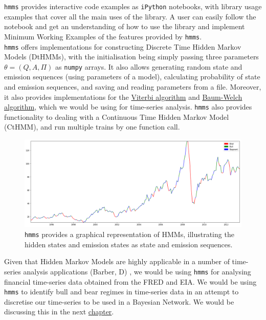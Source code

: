 \texttt{hmms} provides interactive code examples as \texttt{iPython} notebooks, with library usage examples that cover all the main uses of the library. A user can easily follow the notebook and get an understanding of how to use the library and implement Minimum Working Examples of the features provided by \texttt{hmms}.\\

\texttt{hmms} offers implementations for constructing Discrete Time Hidden Markov Models (DtHMMs), with the initialisation being simply passing three parameters $\theta = (Q, A, \Pi)$ as \texttt{numpy} arrays. It also allows generating random state and emission sequences (using parameters of a model), calculating probability of state and emission sequences, and saving and reading parameters from a file. Moreover, it also provides implementations for the \hyperref[viterbi]{Viterbi algorithm} and \hyperref[baumwelch]{Baum-Welch algorithm}, which we would be using for time-series analysis. \texttt{hmms} also provides functionality to dealing with a Continuous Time Hidden Markov Model (CtHMM), and run multiple trains by one function call. \\

\begin{figure}
  \centering
  \includegraphics[width=15cm, scale=0.2]{img/index.png}
  \caption{\texttt{hmms} provides a graphical representation of HMMs, illustrating the hidden states and emission states as state and emission sequences.}
\end{figure}

Given that Hidden Markov Models are highly applicable in a number of time-series analysis applications (Barber, D) \cite{barber2011bayesian}, we would be using \texttt{hmms} for analysing financial time-series data obtained from the FRED and EIA. We would be using \texttt{hmms} to identify bull and bear regimes in time-series data in an attempt to discretise our time-series to be used in a Bayesian Network. We would be discussing this in the next \hyperref[regime]{chapter}. \\




